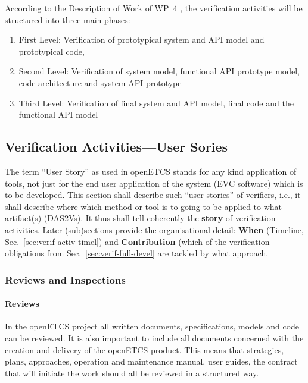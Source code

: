 \documentclass{template/openetcs_report}
\begin{document}
According to the Description of Work of WP~4 \cite{WP4DoW}, the verification
activities will be structured into three main phases: 
\begin{enumerate}
\item First Level: Verification of prototypical system and API model and
  prototypical code,
\item Second Level: Verification of system model, functional API prototype model, code
  architecture and system API prototype
\item Third Level: Verification of final system and API model, final
  code and the functional API model 
\end{enumerate}







\subsection{Verification Activities---User Sories}
\label{sec:verif-activ-user}

The term ``User Story'' as used in openETCS stands for any kind
application of tools, not just for the end user application of the
system (EVC software) which is to be developed. This section shall
describe such ``user stories'' of verifiers, i.e., it
shall describe where which method or tool is to going to be applied to
what artifact(s) (DAS2Vs). It thus shall tell coherently the
\textbf{story} of verification activities. Later (sub)sections provide
the organisational detail: \textbf{When} (Timeline,
Sec.~\ref{sec:verif-activ-timel}) and \textbf{Contribution} (which of
the verification obligations from Sec.~\ref{sec:verif-full-devel} are
tackled by what approach.


\subsubsection{Reviews and Inspections}
\label{sec:reviews-inspec-openETCS}

\paragraph{Reviews}
In the openETCS project
all written documents, specifications, models and code can be
reviewed. It is also important to include all documents concerned with
the creation and delivery of the openETCS product. This means that
strategies, plans, approaches, operation and maintenance manual, user
guides, the contract that will initiate the work should all be
reviewed in a structured way. 
\end{document}
